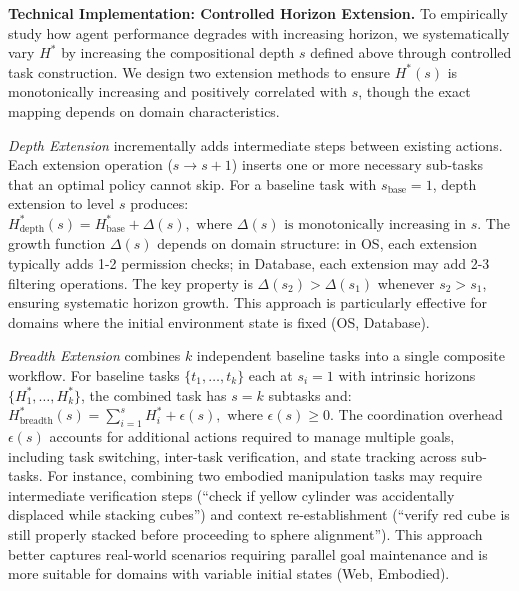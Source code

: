 \documentclass[11pt]{article}
\begin{document}
\textbf{Technical Implementation: Controlled Horizon Extension.}
To empirically study how agent performance degrades with increasing horizon, we systematically vary $H^*$ by increasing the compositional depth $s$ defined above through controlled task construction.
We design two extension methods to ensure $H^*(s)$ is monotonically increasing and positively correlated with $s$, though the exact mapping depends on domain characteristics.

\textit{Depth Extension} incrementally adds intermediate steps between existing actions. Each extension operation ($s \rightarrow s+1$) inserts one or more necessary sub-tasks that an optimal policy cannot skip. For a baseline task with $s_{\text{base}} = 1$, depth extension to level $s$ produces:
$H^*_{\text{depth}}(s) = H^*_{\text{base}} + \Delta(s), \text{ where } \Delta(s) \text{ is monotonically} \text{ increasing in } s$.
The growth function $\Delta(s)$ depends on domain structure: in OS, each extension typically adds 1-2 permission checks; in Database, each extension may add 2-3 filtering operations. The key property is $\Delta(s_2) > \Delta(s_1)$ whenever $s_2 > s_1$, ensuring systematic horizon growth. This approach is particularly effective for domains where the initial environment state is fixed (OS, Database).

\textit{Breadth Extension} combines $k$ independent baseline tasks into a single composite workflow. For baseline tasks $\{t_1, \ldots, t_k\}$ each at $s_i = 1$ with intrinsic horizons $\{H^*_1, \ldots, H^*_k\}$, the combined task has $s = k$ subtasks and:
$H^*_{\text{breadth}}(s) = \sum_{i=1}^{s} H^*_i + \epsilon(s), \text{ where } \epsilon(s) \geq 0$.
The coordination overhead $\epsilon(s)$ accounts for additional actions required to manage multiple goals, including task switching, inter-task verification, and state tracking across sub-tasks. For instance, combining two embodied manipulation tasks may require intermediate verification steps (``check if yellow cylinder was accidentally displaced while stacking cubes'') and context re-establishment (``verify red cube is still properly stacked before proceeding to sphere alignment'').
This approach better captures real-world scenarios requiring parallel goal maintenance and is more suitable for domains with variable initial states (Web, Embodied).
\end{document}

